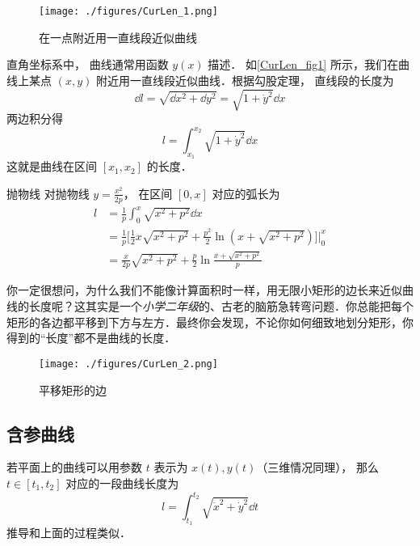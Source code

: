 
\begin{figure}[ht]
\centering
\texttt{[image: ./figures/CurLen\_1.png]}
\caption{在一点附近用一直线段近似曲线} \label{CurLen_fig1}
\end{figure}

直角坐标系中， 曲线通常用函数 $y(x)$ 描述． 如\autoref{CurLen_fig1} 所示，我们在曲线上某点 $(x, y)$ 附近用一直线段近似曲线．根据勾股定理， 直线段的长度为
\begin{equation}
\dd{l} = \sqrt{\dd{x}^2 + \dd{y}^2} = \sqrt{1 + \dot y^2} \dd{x}
\end{equation}
两边积分得
\begin{equation}\label{CurLen_eq1}
l = \int_{x_1}^{x_2} \sqrt{1 + \dot y^2} \dd{x}
\end{equation}
这就是曲线在区间 $[x_1, x_2]$ 的长度．

\begin{example}{抛物线}
对抛物线 $y=\frac{x^2}{2p}$， 在区间 $[0,x]$ 对应的弧长为
\begin{equation}
\begin{aligned}
l& = \frac{1}{p}\int_{0}^{x}\sqrt{x^2+p^2}\dd{x}\\
&=\frac{1}{p}\bigg[\frac{1}{2}x\sqrt{x^2+p^2}+\frac{p^2}{2}\ln(x+\sqrt{x^2+p^2})\bigg]\Bigg\lvert_{0}^{x}\\
&=\frac{x}{2p}\sqrt{x^2+p^2}+\frac{p}{2}\ln\frac{x+\sqrt{x^2+p^2}}{p}
\end{aligned}
\end{equation}
\end{example}

你一定很想问，为什么我们不能像计算面积时一样，用无限小矩形的边长来近似曲线的长度呢？这其实是一个\textsl{小学二年级}的、古老的脑筋急转弯问题．你总能把每个矩形的各边都平移到下方与左方．最终你会发现，不论你如何细致地划分矩形，你得到的“长度”都不是曲线的长度．
\begin{figure}[ht]
\centering
\texttt{[image: ./figures/CurLen\_2.png]}
\caption{平移矩形的边} \label{CurLen_fig2}
\end{figure}

\subsection{含参曲线}
若平面上的曲线可以用参数 $t$ 表示为 $x(t), y(t)$（三维情况同理）， 那么 $t \in [t_1, t_2]$ 对应的一段曲线长度为
\begin{equation}\label{CurLen_eq2}
l = \int_{t_1}^{t_2} \sqrt{\dot x^2 + \dot y^2} \dd{t}
\end{equation}
推导和上面的过程类似．

